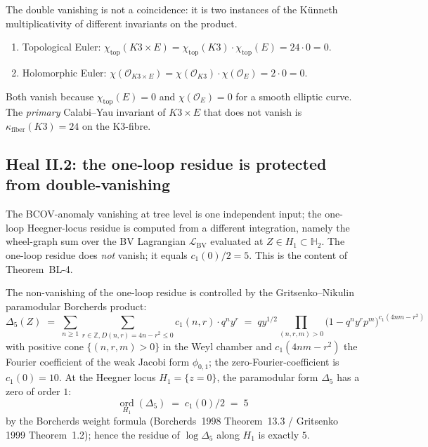 The double vanishing is not a coincidence: it is two instances of the
Künneth multiplicativity of different invariants on the product.
\begin{enumerate}[label=\textup{(\alph*)}]
\item Topological Euler: $\chi_{\mathrm{top}}(K3 \times E) =
\chi_{\mathrm{top}}(K3) \cdot \chi_{\mathrm{top}}(E) = 24 \cdot 0 = 0$.
\item Holomorphic Euler: $\chi(\mathcal{O}_{K3 \times E}) =
\chi(\mathcal{O}_{K3}) \cdot \chi(\mathcal{O}_E) = 2 \cdot 0 = 0$.
\end{enumerate}
Both vanish because $\chi_{\mathrm{top}}(E) = 0$ and $\chi(\mathcal{O}_E) = 0$
for a smooth elliptic curve. The \emph{primary} Calabi--Yau invariant of
$K3 \times E$ that does not vanish is $\kappa_{\mathrm{fiber}}(K3) = 24$
on the K3-fibre.

\subsection*{Heal II.2: the one-loop residue is protected from
double-vanishing}

The BCOV-anomaly vanishing at tree level is one independent input; the
one-loop Heegner-locus residue is computed from a different integration,
namely the wheel-graph sum over the BV Lagrangian
$\mathcal{L}_{\mathrm{BV}}$ evaluated at $Z \in H_1 \subset \mathbb{H}_2$.
The one-loop residue does \emph{not} vanish; it equals $c_1(0)/2 = 5$.
This is the content of Theorem~BL-4.

The non-vanishing of the one-loop residue is controlled by the
Gritsenko--Nikulin paramodular Borcherds product:
\begin{equation}
\label{eq:delta5-borcherds-product}
 \Delta_5(Z) \;=\; \sum_{n \geq 1}
 \sum_{r \in \mathbb{Z}, D(n,r)=4n-r^2 \leq 0}
 c_1(n,r) \cdot q^n y^r
 \;=\; q y^{1/2} \prod_{(n,r,m) > 0}
 \bigl( 1 - q^n y^r p^m \bigr)^{c_1(4nm-r^2)}
\end{equation}
with positive cone $\{(n,r,m) > 0\}$ in the Weyl chamber and
$c_1(4nm - r^2)$ the Fourier coefficient of the weak Jacobi form
$\phi_{0,1}$; the zero-Fourier-coefficient is $c_1(0) = 10$. At the
Heegner locus $H_1 = \{z = 0\}$, the paramodular form $\Delta_5$ has
a zero of order $1$:
\begin{equation}
\label{eq:delta5-zero-on-H1}
 \operatorname*{ord}_{H_1}(\Delta_5) \;=\; c_1(0)/2 \;=\; 5
\end{equation}
by the Borcherds weight formula (Borcherds~1998 Theorem~13.3 / Gritsenko
1999 Theorem~1.2); hence the residue of $\log \Delta_5$ along $H_1$ is
exactly $5$.

